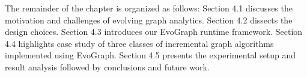 The remainder of the chapter is organized as follows: Section 4.1 discusses the motivation and challenges of evolving graph analytics. Section 4.2 dissects the design choices. Section 4.3 introduces our EvoGraph runtime framework. Section 4.4 highlights case study of three classes of incremental graph algorithms implemented using EvoGraph. Section 4.5 presents the experimental setup and result analysis followed by conclusions and future work. 




